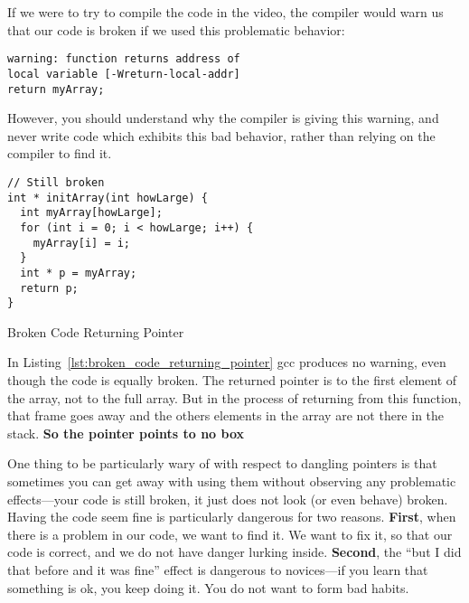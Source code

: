 \documentclass[11pt, a4paper]{article}
\begin{document}
If we were to try to compile the code in the video, the compiler would warn us that our code is broken if we used this problematic behavior:



\texttt{warning: function returns address of \\
  local variable [-Wreturn-local-addr]\\
   return myArray;} 


However, you should understand why the compiler is giving this warning, and never write code which exhibits this bad behavior, rather than relying on the compiler to find it.



\begin{listing}
\begin{verbatim}
// Still broken
int * initArray(int howLarge) {
  int myArray[howLarge];
  for (int i = 0; i < howLarge; i++) {
    myArray[i] = i;
  }
  int * p = myArray;
  return p;
}
\end{verbatim}
\caption{Broken Code Returning Pointer}
\label{lst:broken_code_returning_pointer}
\end{listing}


In Listing~\ref{lst:broken_code_returning_pointer} gcc produces no warning, even though the code is equally broken. The returned pointer is to the first element of the array, not to the full array. But in the process of returning from this function, that frame goes away and the others elements in the array are not there in the stack. \textbf{So the pointer points to no box}



One thing to be particularly wary of with respect to dangling pointers is that sometimes you can get away with using them without observing any problematic effects—your code is still broken, it just does not look (or even behave) broken. Having the code seem fine is particularly dangerous for two reasons. \textbf{First}, when there is a problem in our code, we want to find it. We want to fix it, so that our code is correct, and we do not have danger lurking inside. \textbf{Second}, the “but I did that before and it was fine” effect is dangerous to novices—if you learn that something is ok, you keep doing it. You do not want to form bad habits.
\end{document}
